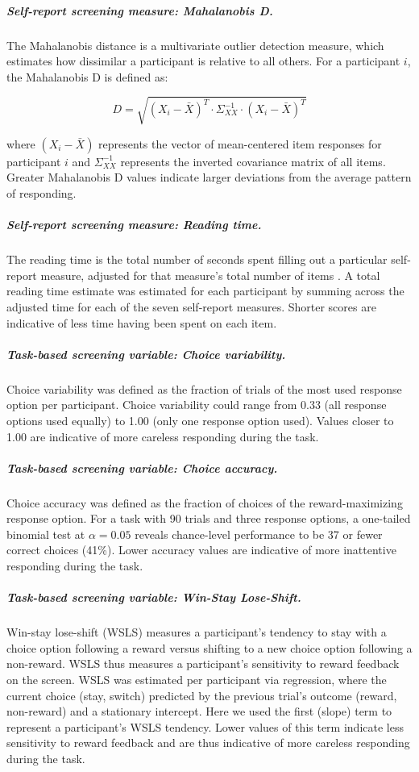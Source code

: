 \documentclass[a4paper,notitlepage,12pt]{article}
\begin{document}
\begin{refsection}[main]
\subparagraph{Self-report screening measure: Mahalanobis D.} The Mahalanobis distance is a multivariate outlier detection measure, which estimates how dissimilar a participant is relative to all others. For a participant $i$, the Mahalanobis D is defined as:

\begin{equation*}
    D = \sqrt{(X_i - \bar{X})^T \cdot \Sigma^{-1}_{XX} \cdot (X_i - \bar{X})^T }
\end{equation*}

where $(X_i - \bar{X})$ represents the vector of mean-centered item responses for participant $i$ and $\Sigma^{-1}_{XX}$ represents the inverted covariance matrix of all items. Greater Mahalanobis D values indicate larger deviations from the average pattern of responding.

\subparagraph{Self-report screening measure: Reading time.} The reading time is the total number of seconds spent filling out a particular self-report measure, adjusted for that measure's total number of items \cite{ophir2020turker}. A total reading time estimate was estimated for each participant by summing across the adjusted time for each of the seven self-report measures. Shorter scores are indicative of less time having been spent on each item.

\subparagraph{Task-based screening variable: Choice variability.} Choice variability was defined as the fraction of trials of the most used response option per participant. Choice variability could range from 0.33 (all response options used equally) to 1.00 (only one response option used). Values closer to 1.00 are indicative of more careless responding during the task.  

\subparagraph{Task-based screening variable: Choice accuracy.} Choice accuracy was defined as the fraction of choices of the reward-maximizing response option. For a task with 90 trials and three response options, a one-tailed binomial test at $\alpha=0.05$ reveals chance-level performance to be 37 or fewer correct choices (41\%). Lower accuracy values are indicative of more inattentive responding during the task.

\subparagraph{Task-based screening variable: Win-Stay Lose-Shift.} Win-stay lose-shift (WSLS) measures a participant's tendency to stay with a choice option following a reward versus shifting to a new choice option following a non-reward. WSLS thus measures a participant's sensitivity to reward feedback on the screen. WSLS was estimated per participant via regression, where the current choice (stay, switch) predicted by the previous trial's outcome (reward, non-reward) and a stationary intercept. Here we used the first (slope) term to represent a participant's WSLS tendency. Lower values of this term indicate less sensitivity to reward feedback and are thus indicative of more careless responding during the task.


\end{refsection}
\end{document}
